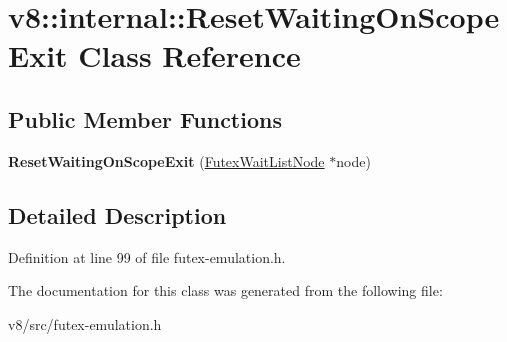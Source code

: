 \hypertarget{classv8_1_1internal_1_1ResetWaitingOnScopeExit}{}\section{v8\+:\+:internal\+:\+:Reset\+Waiting\+On\+Scope\+Exit Class Reference}
\label{classv8_1_1internal_1_1ResetWaitingOnScopeExit}
\subsection*{Public Member Functions}
\begin{DoxyCompactItemize}
\item 
\mbox{\label{classv8_1_1internal_1_1ResetWaitingOnScopeExit_aefd0b1335bc9a6777d8804ec220a4326}} 
{\bfseries Reset\+Waiting\+On\+Scope\+Exit} (\mbox{\hyperlink{classv8_1_1internal_1_1FutexWaitListNode}{Futex\+Wait\+List\+Node}} $\ast$node)
\end{DoxyCompactItemize}


\subsection{Detailed Description}


Definition at line 99 of file futex-\/emulation.\+h.



The documentation for this class was generated from the following file\+:\begin{DoxyCompactItemize}
\item 
v8/src/futex-\/emulation.\+h\end{DoxyCompactItemize}
